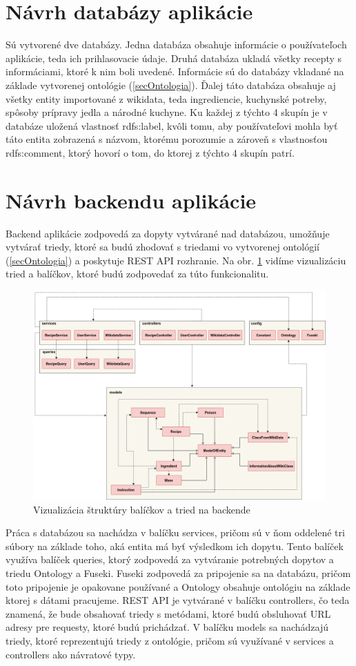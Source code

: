 \section{Návrh databázy aplikácie}
Sú vytvorené dve databázy. Jedna databáza obsahuje informácie o používateľoch aplikácie, teda ich prihlasovacie údaje. Druhá databáza ukladá všetky recepty s informáciami, ktoré k nim boli uvedené. Informácie sú do databázy vkladané na základe vytvorenej ontológie (\ref{secOntologia}). Ďalej táto databáza obsahuje aj všetky entity importované z wikidata, teda ingrediencie, kuchynské potreby, spôsoby prípravy jedla a národné kuchyne. Ku každej z týchto 4 skupín je v databáze uložená vlastnosť rdfs:label, kvôli tomu, aby používateľovi mohla byť táto entita zobrazená s názvom, ktorému porozumie a zároveň s vlastnosťou rdfs:comment, ktorý hovorí o tom, do ktorej z týchto 4 skupín patrí. 

\section{Návrh backendu aplikácie}
Backend aplikácie zodpovedá za dopyty vytvárané nad databázou, umožňuje vytvárať triedy, ktoré sa budú zhodovať s triedami vo vytvorenej ontológií (\ref{secOntologia}) a poskytuje REST API rozhranie. Na obr. \ref{backend} vidíme vizualizáciu tried a balíčkov, ktoré budú zodpovedať za túto funkcionalitu.
\begin{figure}[h]
\includegraphics[width=\textwidth]{images/backend}
\caption{Vizualizácia štruktúry balíčkov a tried na backende}
\label{backend}
\end{figure}
Práca s databázou sa nachádza v balíčku services, pričom sú v ňom oddelené tri súbory na základe toho, aká entita má byť výsledkom ich dopytu. Tento balíček využíva balíček queries, ktorý zodpovedá za vytváranie potrebných dopytov a triedu Ontology a Fuseki. Fuseki zodpovedá za pripojenie sa na databázu, pričom toto pripojenie je opakovane používané a Ontology obsahuje ontológiu na základe ktorej s dátami pracujeme. REST API je vytvárané v balíčku controllers, čo teda znamená, že bude obsahovať triedy s metódami, ktoré budú obsluhovať URL adresy pre requesty, ktoré budú prichádzať. V balíčku models sa nachádzajú triedy, ktoré reprezentujú triedy z ontológie, pričom sú využívané v services a controllers ako návratové typy. 

